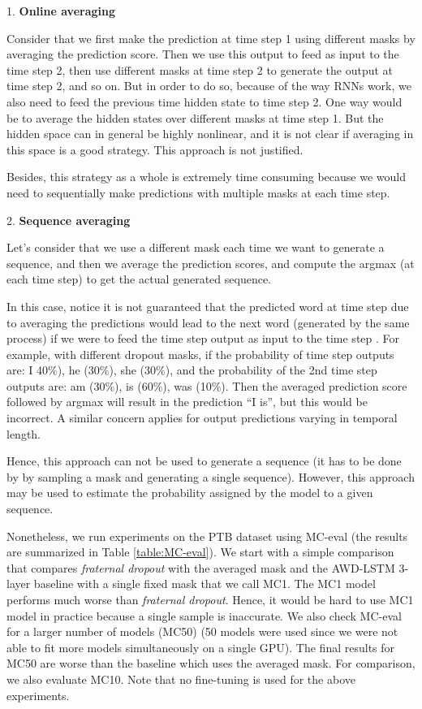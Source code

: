 \documentclass{article} \usepackage{iclr2018_conference,times}
\begin{document}
1. \textbf{Online averaging}

Consider that we first make the prediction at time step 1 using different masks by averaging the prediction score. Then we use this output to feed as input to the time step 2, then use different masks at time step 2 to generate the output at time step 2, and so on. But in order to do so, because of the way RNNs work, we also need to feed the previous time hidden state to time step 2. One way would be to average the hidden states over different masks at time step 1. But the hidden space can in general be highly nonlinear, and it is not clear if averaging in this space is a good strategy. This approach is not justified.

Besides, this strategy as a whole is extremely time consuming because we would need to sequentially make predictions with multiple masks at each time step.

2. \textbf{Sequence averaging}

Let's consider that we use a different mask each time we want to generate a sequence, and then we average the prediction scores, and compute the argmax (at each time step) to get the actual generated sequence.

In this case, notice it is not guaranteed that the predicted word at time step  due to averaging the predictions would lead to the next word (generated by the same process) if we were to feed the time step  output as input to the time step . For example, with different dropout masks, if the probability of  time step outputs are: I 40\%), he (30\%), she (30\%), and the probability of the 2nd time step outputs are: am (30\%), is (60\%), was (10\%). Then the averaged prediction score followed by argmax will result in the prediction ``I is'', but this would be incorrect. A similar concern applies for output predictions varying in temporal length.

Hence, this approach can not be used to generate a sequence (it has to be done by by sampling a mask and generating a single sequence). However, this approach may be used to estimate the probability assigned by the model to a given sequence.

Nonetheless, we run experiments on the PTB dataset using MC-eval (the results are summarized in Table \ref{table:MC-eval}). We start with a simple comparison that compares \emph{fraternal dropout} with the averaged mask and the AWD-LSTM 3-layer baseline with a single fixed mask that we call MC1. The MC1 model performs much worse than \emph{fraternal dropout}. Hence, it would be hard to use MC1 model in practice because a single sample is inaccurate. We also check MC-eval for a larger number of models (MC50) (50 models were used since we were not able to fit more models simultaneously on a single GPU). The final results for MC50 are worse than the baseline which uses the averaged mask. For comparison, we also evaluate MC10. Note that no fine-tuning is used for the above experiments.
\end{document}
